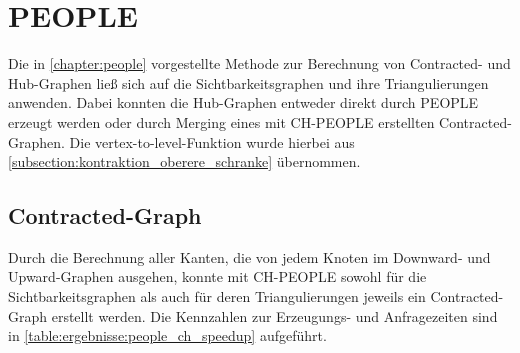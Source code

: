 \section{PEOPLE}

Die in \autoref{chapter:people} vorgestellte Methode zur Berechnung von Contracted- und Hub-Graphen ließ sich auf die Sichtbarkeitsgraphen und ihre Triangulierungen anwenden.
Dabei konnten die Hub-Graphen entweder direkt durch PEOPLE erzeugt werden oder durch Merging eines mit CH-PEOPLE erstellten Contracted-Graphen.
Die vertex-to-level-Funktion wurde hierbei aus \autoref{subsection:kontraktion_oberere_schranke} übernommen.

\subsection{Contracted-Graph}

Durch die Berechnung aller Kanten, die von jedem Knoten im Downward- und Upward-Graphen ausgehen, konnte mit CH-PEOPLE sowohl für die Sichtbarkeitsgraphen als auch für deren Triangulierungen jeweils ein Contracted-Graph erstellt werden.
Die Kennzahlen zur Erzeugungs- und Anfragezeiten sind in \autoref{table:ergebnisse:people_ch_speedup} aufgeführt.

